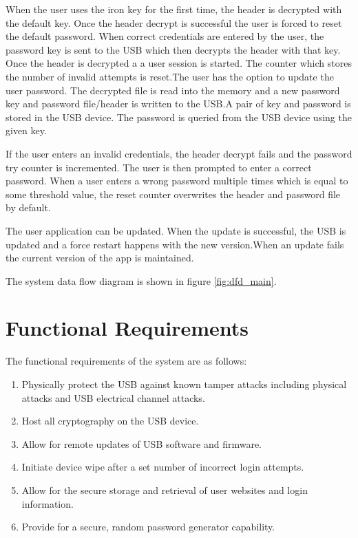When the user uses the iron key for the first time, the header is decrypted with
the default key. Once the header decrypt is successful the user is forced to
reset the default password. When correct credentials are entered by the user,
the password key is sent to the USB which then decrypts the header with that
key.  Once the header is decrypted a a user session is started. The counter
which stores the number of invalid attempts is reset.The user has the option to
update the user password. The decrypted file is read into the memory and a new
password key and password file/header is written to the USB.A pair of key and
password is stored in the USB device. The password is queried from the USB
device using the given key.

If the user enters an invalid credentials, the header decrypt fails and the
password try counter is incremented. The user is
then prompted to enter a correct password. When a user enters a wrong password
multiple times which is equal to some threshold value, the reset counter
overwrites the header and password file by default.

The user application can be updated. When the update is successful, the USB is
updated and a force restart happens with the new version.When an update fails
the current version of the app is maintained.

The system data flow diagram is shown in figure \ref{fig:dfd_main}.


\section{Functional Requirements}
\label{sec:funcreq}
The functional requirements of the system are as follows:
\begin{enumerate}
    \item{Physically protect the USB against known tamper attacks including
physical attacks and USB electrical channel attacks.}
    \item{Host all cryptography on the USB device.}
    \item{Allow for remote updates of USB software and firmware.}
    \item{Initiate device wipe after a set number of incorrect login attempts.}
    \item{Allow for the secure storage and retrieval of user websites and login
information.}
    \item{Provide for a secure, random password generator capability.}
\end{enumerate}
